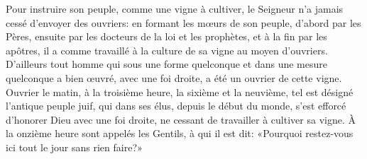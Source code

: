 Pour instruire son peuple, comme une vigne à cultiver,
	le Seigneur n'a jamais cessé d'envoyer des ouvriers:
	en formant les mœurs de son peuple, d'abord par les Pères,
		ensuite par les docteurs de la loi et les prophètes,
		et à la fin par les apôtres,
	il a comme travaillé à la culture de sa vigne au moyen d'ouvriers.
D'ailleurs tout homme qui sous une forme quelconque
		et dans une mesure quelconque a bien œuvré,
	avec une foi droite, a été un ouvrier de cette vigne.
Ouvrier le matin, à la troisième heure, la sixième et la neuvième,
	tel est désigné l'antique peuple juif, qui dans ses élus, depuis le début du monde,
	s'est efforcé d'honorer Dieu avec une foi droite,
	ne cessant de travailler à cultiver sa vigne.
À la onzième heure sont appelés les Gentils, à qui il est dit:
	«Pourquoi restez-vous ici tout le jour sans rien faire?»
